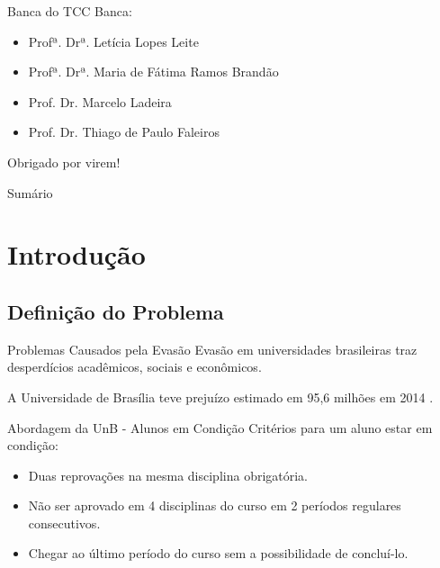 \begin{frame}{Banca do TCC}
    Banca: 
    \begin{itemize}
        \item Profª. Drª. Letícia Lopes Leite
        \item Profª. Drª. Maria de Fátima Ramos Brandão
        \item Prof. Dr. Marcelo Ladeira 
        \item Prof. Dr. Thiago de Paulo Faleiros
    \end{itemize}
    \vspace{0.5cm}

    Obrigado por virem!
\end{frame}

\begin{frame}{Sumário}
    \tableofcontents[hideallsubsections]
\end{frame}

\section{Introdução}
\subsection{Definição do Problema}
\begin{frame}{Problemas Causados pela Evasão}
    Evasão em universidades brasileiras traz desperdícios acadêmicos, sociais e
    econômicos.  

    \vspace{0.5cm}

    A Universidade de Brasília teve prejuízo estimado em 95,6 milhões em 2014
    \cite{correio}.
\end{frame}

\begin{frame}{Abordagem da UnB - Alunos em Condição}
    Critérios para um aluno estar em condição: 
    \begin{itemize}
        \item Duas reprovações na mesma disciplina obrigatória.
        \item Não ser aprovado em 4 disciplinas do curso em 2 períodos regulares
            consecutivos.
        \item Chegar ao último período do curso sem a possibilidade de concluí-lo. 
    \end{itemize}
\end{frame}

